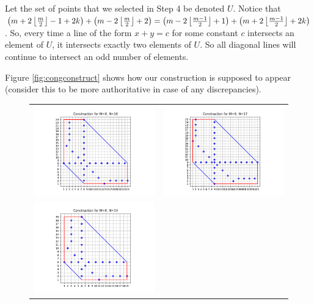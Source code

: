 \documentclass[10pt]{../usamts}
\begin{document}
\begin{solution}
\begin{enumerate}
    Let the set of points that we selected in Step 4 be denoted $U$. Notice that $\left(  m+2\left\lfloor \frac{m}{2} \right\rfloor-1+2k \right)+\left( m-2\left\lfloor \frac{m}{2} \right\rfloor+2 \right) = \left( m-2\left\lfloor \frac{m-1}{2} \right\rfloor+1 \right)+\left( m+2\left\lfloor \frac{m-1}{2} \right\rfloor+2k \right)$. So, every time a line of the form $x+y=c$ for some constant $c$ intersects an element of $U$, it intersects exactly two elements of $U$. So all diagonal lines will continue to intersect an odd number of elements.
\end{enumerate}

Figure \ref{fig:congconstruct} shows how our construction is supposed to appear (consider this to be more authoritative in case of any discrepancies).

\begin{figure}[htbp]
\centering
    \begin{tabular}{c c}
    \includegraphics[width=9cm]{round2/p5construct/construct_8_16.png}&
    \includegraphics[width=9cm]{round2/p5construct/construct_9_17.png}\\
    \includegraphics[width=9cm]{round2/p5construct/construct_6_14.png}&

\end{tabular}
\end{figure}
\end{solution}
\end{document}

